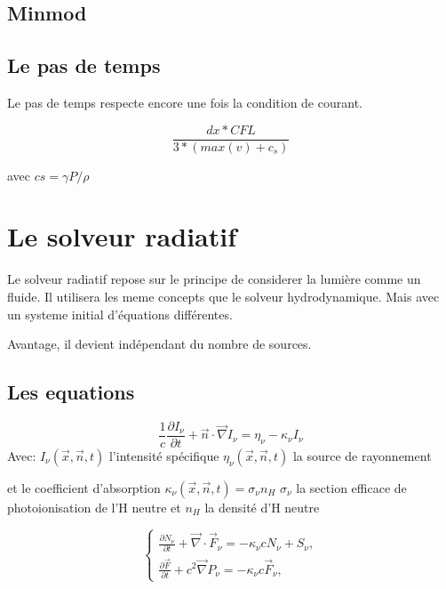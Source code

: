 \subsection{Minmod}



\subsection{Le pas de temps}

Le pas de temps respecte encore une fois la condition de courant.

\begin{equation}
\frac{dx * CFL }{3*(max(v) + c_s)}
\end{equation}

avec $cs = \gamma P/\rho$

\section{Le solveur radiatif}

Le solveur radiatif repose sur le principe de considerer la lumière comme un fluide.
Il utilisera les meme concepts que le solveur hydrodynamique.
Mais avec un systeme initial d'équations différentes. 

Avantage, il devient indépendant du nombre de sources.


\subsection{Les equations}
\begin{equation}
\frac{1}{c} \frac{\partial I_\nu}{\partial t} + \vec{n}\cdot \vec{\nabla} I_\nu = \eta_\nu - \kappa_\nu I_\nu 
\end{equation}
Avec: $I_\nu(\vec{x},\vec{n},t)$ l'intensité spécifique
$\eta_\nu(\vec{x},\vec{n},t)$ la source de rayonnement

et le coefficient d'absorption $\kappa_\nu(\vec{x},\vec{n},t) = \sigma_\nu n_H$ 
$\sigma_\nu$ la section efficace de photoionisation de l'H neutre et $n_H$ la densité d'H neutre


\begin{equation}
\begin{cases}

\frac{ \partial N_\nu }{ \partial t } + \vec{\nabla} \cdot \vec{F}_\nu = -\kappa_\nu c  N_\nu + S_\nu,\\

\frac{ \partial \vec{F} }{ \partial t } + c^2 \vec{\nabla} P_\nu = -\kappa_\nu c \vec{F}_\nu ,

\end{cases}
\label{eq:densite_energie}
\end{equation}


